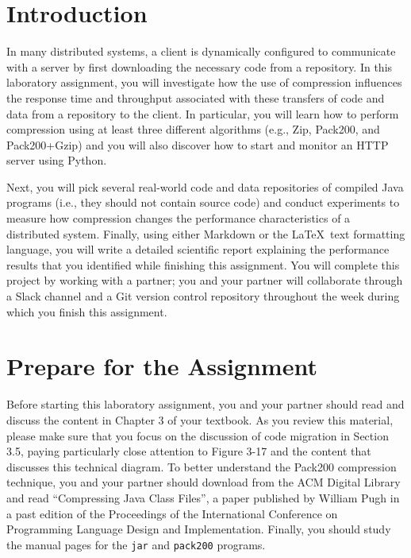 


\usepackage[compact]{titlesec}



\section*{Introduction}

In many distributed systems, a client is dynamically configured to communicate with a server by first downloading the
necessary code from a repository. In this laboratory assignment, you will investigate how the use of compression
influences the response time and throughput associated with these transfers of code and data from a repository to the
client. In particular, you will learn how to perform compression using at least three different algorithms (e.g., Zip,
Pack200, and Pack200+Gzip) and you will also discover how to start and monitor an HTTP server using Python.

Next, you will pick several real-world code and data repositories of compiled Java programs (i.e., they should not
contain source code) and conduct experiments to measure how compression changes the performance characteristics of a
distributed system.  Finally, using either Markdown or the \LaTeX~text formatting language, you will write a detailed
scientific report explaining the performance results that you identified while finishing this assignment. You will
complete this project by working with a partner; you and your partner will collaborate through a Slack channel and a Git
version control repository throughout the week during which you finish this assignment.

\section*{Prepare for the Assignment}

Before starting this laboratory assignment, you and your partner should read and discuss the content in Chapter 3
of your textbook. As you review this material, please make sure that you focus on the discussion of code migration in
Section 3.5, paying particularly close attention to Figure 3-17 and the content that discusses this technical diagram.
To better understand the Pack200 compression technique, you and your partner should download from the ACM Digital
Library and read ``Compressing Java Class Files'', a paper published by William Pugh in a past edition of the
Proceedings of the International Conference on Programming Language Design and Implementation. Finally, you should study
the manual pages for the {\tt jar} and {\tt pack200} programs.

